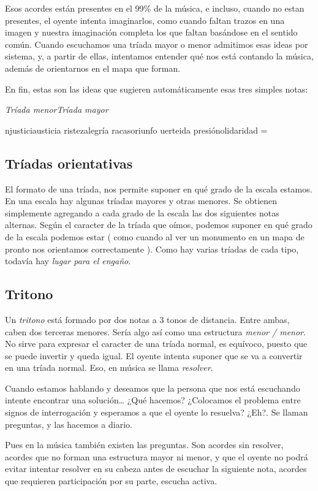 \documentclass[]{article}
\begin{document}
Esos acordes están presentes en el 99\% de la música, e incluso, cuando no estan presentes, el oyente intenta imaginarlos, como cuando faltan trazos en una imagen y nuestra imaginación completa los que faltan basándose en el sentido común. Cuando escuchamos una tríada mayor o menor admitimos esas ideas por sistema, y, a partir de ellas, intentamos entender qué nos está contando la música, además de orientarnos en el mapa que forman.

En fin, estas son las ideas que sugieren automáticamente esas tres simples notas:

\emph{\emph{Tríada menor}}\emph{\emph{Tríada mayor}}

njusticiausticia ristezalegría racasoriunfo uerteida presiónolidaridad =

\subsection{Tríadas orientativas}

El formato de una tríada, nos permite suponer en qué grado de la escala estamos. En una escala hay algunas tríadas mayores y otras menores. Se obtienen simplemente agregando a cada grado de la escala las dos siguientes notas alternas. Según el caracter de la tríada que oímos, podemos suponer en qué grado de la escala podemos estar ( como cuando al ver un monumento en un mapa de pronto nos orientamos correctamente ). Como hay varias tríadas de cada tipo, todavía hay \emph{lugar para el   engaño}.

\subsection{Tritono}

Un \emph{tritono} está formado por dos notas a 3 tonos de distancia. Entre ambas, caben dos terceras menores. Sería algo así como una estructura \emph{menor / menor}. No sirve para expresar el caracter de una tríada normal, es equívoco, puesto que se puede invertir y queda igual. El oyente intenta suponer que se va a convertir en una tríada normal. Eso, en música se llama \emph{resolver}.

Cuando estamos hablando y deseamos que la persona que nos está escuchando intente encontrar una solución\ldots{} ¿Qué hacemos? ¿Colocamos el problema entre signos de interrogación y esperamos a que el oyente lo resuelva? ¿Eh?. Se llaman preguntas, y las hacemos a diario.

Pues en la música también existen las preguntas. Son acordes sin resolver, acordes que no forman una estructura mayor ni menor, y que el oyente no podrá evitar intentar resolver en su cabeza antes de escuchar la siguiente nota, acordes que requieren participación por su parte, escucha activa.
\end{document}
